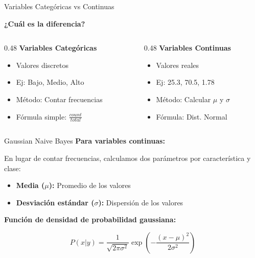\documentclass{beamer}
\begin{document}
\begin{frame}{Variables Categóricas vs Continuas}
    \begin{center}
        \textbf{¿Cuál es la diferencia?}
    \end{center}

    \vspace{0.5cm}

    \begin{columns}
        \begin{column}{0.48\textwidth}
            \textbf{Variables Categóricas}
            \begin{itemize}
                \item Valores discretos
                \item Ej: Bajo, Medio, Alto
                \item Método: Contar frecuencias
                \item Fórmula simple: $\frac{count}{total}$
            \end{itemize}
        \end{column}
        \begin{column}{0.48\textwidth}
            \textbf{Variables Continuas}
            \begin{itemize}
                \item Valores reales
                \item Ej: 25.3, 70.5, 1.78
                \item Método: Calcular $\mu$ y $\sigma$
                \item Fórmula: Dist. Normal
            \end{itemize}
        \end{column}
    \end{columns}
\end{frame}

\begin{frame}{Gaussian Naive Bayes}
    \textbf{Para variables continuas:}

    En lugar de contar frecuencias, calculamos dos parámetros por característica y clase:

    \vspace{0.5cm}

    \begin{itemize}
        \item \textbf{Media ($\mu$):} Promedio de los valores
        \item \textbf{Desviación estándar ($\sigma$):} Dispersión de los valores
    \end{itemize}

    \vspace{0.8cm}

    \textbf{Función de densidad de probabilidad gaussiana:}

    \[
    P(x|y) = \frac{1}{\sqrt{2\pi\sigma^2}} \exp\left(-\frac{(x-\mu)^2}{2\sigma^2}\right)
    \]
\end{frame}
\end{document}
